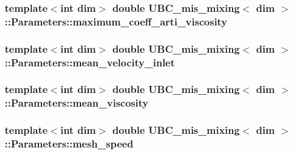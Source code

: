 \subsubsection[{maximum\+\_\+coeff\+\_\+arti\+\_\+viscosity}]{\setlength{\rightskip}{0pt plus 5cm}template$<$int dim$>$ double {\bf U\+B\+C\+\_\+mis\+\_\+mixing}$<$ dim $>$\+::Parameters\+::maximum\+\_\+coeff\+\_\+arti\+\_\+viscosity}\label{struct_u_b_c__mis__mixing_1_1_parameters_aab1eefbfc10c6c2fbf6e17c0052e1e66}
\hypertarget{struct_u_b_c__mis__mixing_1_1_parameters_a4e2da6f12751c597845f9ec3d3c124c2}{}
\subsubsection[{mean\+\_\+velocity\+\_\+inlet}]{\setlength{\rightskip}{0pt plus 5cm}template$<$int dim$>$ double {\bf U\+B\+C\+\_\+mis\+\_\+mixing}$<$ dim $>$\+::Parameters\+::mean\+\_\+velocity\+\_\+inlet}\label{struct_u_b_c__mis__mixing_1_1_parameters_a4e2da6f12751c597845f9ec3d3c124c2}
\hypertarget{struct_u_b_c__mis__mixing_1_1_parameters_acc367af009234bfb0e3c6af0d3872ce2}{}
\subsubsection[{mean\+\_\+viscosity}]{\setlength{\rightskip}{0pt plus 5cm}template$<$int dim$>$ double {\bf U\+B\+C\+\_\+mis\+\_\+mixing}$<$ dim $>$\+::Parameters\+::mean\+\_\+viscosity}\label{struct_u_b_c__mis__mixing_1_1_parameters_acc367af009234bfb0e3c6af0d3872ce2}
\hypertarget{struct_u_b_c__mis__mixing_1_1_parameters_a0211ea3e9c7db88805129ebd42cdceb9}{}
\subsubsection[{mesh\+\_\+speed}]{\setlength{\rightskip}{0pt plus 5cm}template$<$int dim$>$ double {\bf U\+B\+C\+\_\+mis\+\_\+mixing}$<$ dim $>$\+::Parameters\+::mesh\+\_\+speed}\label{struct_u_b_c__mis__mixing_1_1_parameters_a0211ea3e9c7db88805129ebd42cdceb9}
\hypertarget{struct_u_b_c__mis__mixing_1_1_parameters_a897cb7915129443818689eba5432f95e}{}
